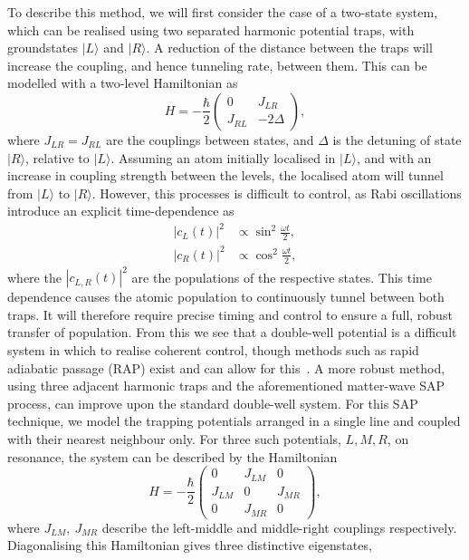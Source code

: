 To describe this method, we will first consider the case of a two-state system, which can be realised using two separated harmonic potential traps, with groundstates $| L \rangle$ and $| R \rangle$. A reduction of the distance between the traps will increase the coupling, and hence tunneling rate, between them. This can be modelled with a two-level Hamiltonian as
\begin{equation}
    H = -\frac{\hbar}{2}
    \begin{pmatrix}
        0 & J_{LR} \\
        J_{RL} & -2\Delta
    \end{pmatrix},
\end{equation}
where $J_{LR} = J_{RL}$ are the couplings between states, and $\Delta$ is the detuning of state $| R \rangle$, relative to $| L \rangle$. Assuming an atom initially localised in $| L \rangle$, and with an increase in coupling strength between the levels, the localised atom will tunnel from $| L \rangle$ to $| R \rangle $. However, this processes is difficult to control, as Rabi oscillations introduce an explicit time-dependence as
\begin{subequations}
\begin{align}
    |c_L(t)|^2 &\propto \sin^2 \frac{\omega t}{2} ,\\
    |c_R(t)|^2 &\propto \cos^2 \frac{\omega t}{2},
\end{align}
\end{subequations}
where the $|c_{L,R}(t)|^2$ are the populations of the respective states. This time dependence causes the atomic population to continuously tunnel between both traps. It will therefore require precise timing and control to ensure a full, robust transfer of population. From this we see that a double-well potential is a difficult system in which to realise coherent control, though methods such as rapid adiabatic passage (RAP) exist and can allow for this~\cite{AO:Vitanov_arpc_2001}. A more robust method, using three adjacent harmonic traps and the aforementioned matter-wave SAP process, can improve upon the standard double-well system. For this SAP technique, we model the trapping potentials arranged in a single line and coupled with their nearest neighbour only. For three such potentials, $L,M,R$, on resonance, the system can be described by the Hamiltonian
\begin{equation}\label{eqn:sap_ham}
    H = -\frac{\hbar}{2}
    \begin{pmatrix}
        0 & J_{LM} & 0 \\
        J_{LM} & 0 & J_{MR} \\
        0 & J_{MR} & 0
    \end{pmatrix},
\end{equation}
where $J_{LM},~J_{MR}$ describe the left-middle and middle-right couplings respectively. Diagonalising this Hamiltonian gives three distinctive eigenstates,

